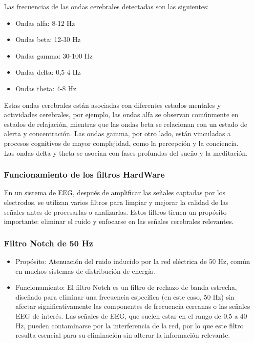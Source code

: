 \documentclass{article}
\begin{document}
Las frecuencias de las ondas cerebrales detectadas son las siguientes:

\begin{itemize}
    \item Ondas alfa: 8-12 Hz
    \item Ondas beta: 12-30 Hz
    \item Ondas gamma: 30-100 Hz
    \item Ondas delta: 0,5-4 Hz
    \item Ondas theta: 4-8 Hz
\end{itemize}

Estas ondas cerebrales están asociadas con diferentes estados mentales y actividades cerebrales, por ejemplo, las ondas alfa se observan comúnmente en estados de relajación, mientras que las ondas beta se relacionan con un estado de alerta y concentración. Las ondas gamma, por otro lado, están vinculadas a procesos cognitivos de mayor complejidad, como la percepción y la conciencia. Las ondas delta y theta se asocian con fases profundas del sueño y la meditación.

\subsubsection{Funcionamiento de los filtros HardWare}

En un sistema de EEG, después de amplificar las señales captadas por los electrodos, se utilizan varios filtros para limpiar y mejorar la calidad de las señales antes de procesarlas o analizarlas. Estos filtros tienen un propósito importante: eliminar el ruido y enfocarse en las señales cerebrales relevantes. 

\subsubsection{Filtro Notch de 50 Hz}
\begin{itemize}
    \item Propósito: Atenuación del ruido inducido por la red eléctrica de 50 Hz, común en muchos sistemas de distribución de energía.
    \item Funcionamiento: El filtro Notch es un filtro de rechazo de banda estrecha, diseñado para eliminar una frecuencia específica (en este caso, 50 Hz) sin afectar significativamente las componentes de frecuencia cercanas o las señales EEG de interés. Las señales de EEG, que suelen estar en el rango de 0,5 a 40 Hz, pueden contaminarse por la interferencia de la red, por lo que este filtro resulta esencial para su eliminación sin alterar la información relevante.
\end{itemize}
\end{document}
